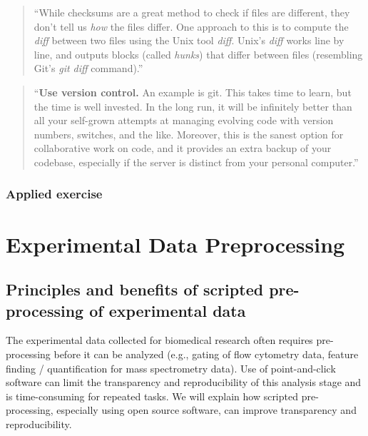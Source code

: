 \documentclass[]{tufte-book}
\begin{document}
\begin{quote}
``While checksums are a great method to check if files are different, they don't tell
us \emph{how} the files differ. One approach to this is to compute the \emph{diff} between
two files using the Unix tool \emph{diff}. Unix's \emph{diff} works line by line, and outputs
blocks (called \emph{hunks}) that differ between files (resembling Git's \emph{git diff} command).''
\citep{buffalo2015bioinformatics}
\end{quote}

\begin{quote}
``\textbf{Use version control.} An example is git. This takes time to learn, but the
time is well invested. In the long run, it will be infinitely better than all your
self-grown attempts at managing evolving code with version numbers, switches,
and the like. Moreover, this is the sanest option for collaborative work on code,
and it provides an extra backup of your codebase, especially if the server is
distinct from your personal computer.'' \citep{holmes2018modern}
\end{quote}

\hypertarget{applied-exercise-3}{%
\subsection{Applied exercise}\label{applied-exercise-3}}

\hypertarget{experimental-data-preprocessing}{%
\chapter{Experimental Data Preprocessing}\label{experimental-data-preprocessing}}

\hypertarget{principles-and-benefits-of-scripted-pre-processing-of-experimental-data}{%
\section{Principles and benefits of scripted pre-processing of experimental data}\label{principles-and-benefits-of-scripted-pre-processing-of-experimental-data}}

The experimental data collected for biomedical research often requires
pre-processing before it can be analyzed (e.g., gating of flow cytometry data,
feature finding / quantification for mass spectrometry data). Use of
point-and-click software can limit the transparency and reproducibility of this
analysis stage and is time-consuming for repeated tasks. We will explain how
scripted pre-processing, especially using open source software, can improve
transparency and reproducibility.
\end{document}
